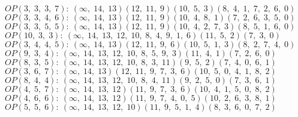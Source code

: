 $OP(3, \;3, \;3, \;7): \:(\infty, \;14, \;13)(12, \;11, \;9)(10, \;5, \;3)(8, \;4, \;1, \;7, \;2, \;6, \;0)$\\
$OP(3, \;3, \;4, \;6): \:(\infty, \;14, \;13)(12, \;11, \;9)(10, \;4, \;8, \;1)(7, \;2, \;6, \;3, \;5, \;0)$\\
$OP(3, \;3, \;5, \;5): \:(\infty, \;14, \;13)(12, \;11, \;9)(10, \;4, \;2, \;7, \;3)(8, \;5, \;1, \;6, \;0)$\\
$OP(10, \;3, \;3): \:(\infty, \;14, \;13, \;12, \;10, \;8, \;4, \;9, \;1, \;6)(11, \;5, \;2)(7, \;3, \;0)$\\
$OP(3, \;4, \;4, \;5): \:(\infty, \;14, \;13)(12, \;11, \;9, \;6)(10, \;5, \;1, \;3)(8, \;2, \;7, \;4, \;0)$\\
$OP(9, \;3, \;4): \:(\infty, \;14, \;13, \;12, \;10, \;8, \;5, \;9, \;3)(11, \;4, \;1)(7, \;2, \;6, \;0)$\\
$OP(8, \;3, \;5): \:(\infty, \;14, \;13, \;12, \;10, \;8, \;3, \;11)(9, \;5, \;2)(7, \;4, \;0, \;6, \;1)$\\
$OP(3, \;6, \;7): \:(\infty, \;14, \;13)(12, \;11, \;9, \;7, \;3, \;6)(10, \;5, \;0, \;4, \;1, \;8, \;2)$\\
$OP(8, \;4, \;4): \:(\infty, \;14, \;13, \;12, \;10, \;8, \;4, \;11)(9, \;2, \;5, \;0)(7, \;3, \;6, \;1)$\\
$OP(4, \;5, \;7): \:(\infty, \;14, \;13, \;12)(11, \;9, \;7, \;3, \;6)(10, \;4, \;1, \;5, \;0, \;8, \;2)$\\
$OP(4, \;6, \;6): \:(\infty, \;14, \;13, \;12)(11, \;9, \;7, \;4, \;0, \;5)(10, \;2, \;6, \;3, \;8, \;1)$\\
$OP(5, \;5, \;6): \:(\infty, \;14, \;13, \;12, \;10)(11, \;9, \;5, \;1, \;4)(8, \;3, \;6, \;0, \;7, \;2)$\\

